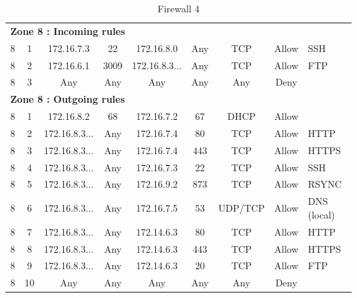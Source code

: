 \documentclass[a4paper,titlepage]{article}
\begin{document}
\begin{table}[h]
\begin{tabular}{c|c|cc|cc|ccl}
		\hline
		\multicolumn{9}{l}{\textbf{Zone 8 : Incoming rules}}\\
		8 & 1 & 172.16.7.3 & 22 & 172.16.8.0 & Any & TCP & Allow & SSH \\
		8 & 2 & 172.16.6.1 & 3009 & 172.16.8.3... & Any & TCP & Allow & FTP \\
		8 & 3 & Any & Any & Any & Any & Any & Deny & \\
		\hline
		\multicolumn{9}{l}{\textbf{Zone 8 : Outgoing rules}}\\
		8 & 1 & 172.16.8.2 & 68 & 172.16.7.2 & 67 & DHCP & Allow & \\
		8 & 2 & 172.16.8.3... & Any & 172.16.7.4 & 80 & TCP & Allow & HTTP \\
		8 & 3 & 172.16.8.3... & Any & 172.16.7.4 & 443 & TCP & Allow & HTTPS \\
		8 & 4 & 172.16.8.3... & Any & 172.16.7.3 & 22 & TCP & Allow & SSH \\
		8 & 5 & 172.16.8.3... & Any & 172.16.9.2 & 873 & TCP & Allow & RSYNC \\
		8 & 6 & 172.16.8.3... & Any & 172.16.7.5 & 53 & UDP/TCP & Allow & DNS (local) \\
		8 & 7 & 172.16.8.3... & Any & 172.14.6.3 & 80 & TCP & Allow & HTTP \\
		8 & 8 & 172.16.8.3... & Any & 172.14.6.3 & 443 & TCP & Allow & HTTPS \\
		8 & 9 & 172.16.8.3... & Any & 172.14.6.3 & 20 & TCP & Allow & FTP \\
		8 & 10 & Any & Any & Any & Any & Any & Deny & \\
		\hline
		
	\end{tabular}
	\caption{Firewall 4}
\end{table}
\end{document}
